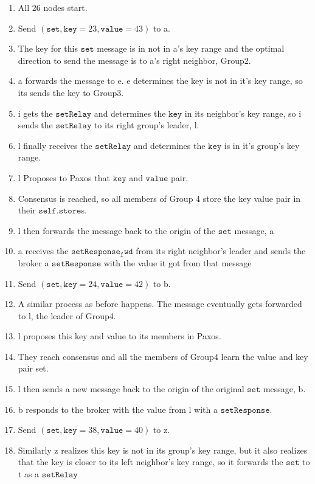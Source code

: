 \documentclass{amsart}
\theoremstyle{definition}
\theoremstyle{remark}
\numberwithin{equation}{section}
\begin{document}
\begin{enumerate}
\item All 26 nodes start.
\item Send $(\mathtt{set}, \mathtt{key}=23, \mathtt{value}=43)$ to a.
\item The key for this $\mathtt{set}$ message is in not in a's key range and the optimal direction to send the message is to a's right neighbor, Group2. 
\item a forwards the message to e. e determines the key is not in it's key range, so its sends the key to Group3.
\item i gets the $\mathtt{setRelay}$ and determines the $\mathtt{key}$ in its neighbor's key range, so i sends the $\mathtt{setRelay}$ to its right group's leader, l.
\item l finally receives the $\mathtt{setRelay}$ and determines the $\mathtt{key}$ is in it's group's key range.
\item l Proposes to Paxos that $\mathtt{key}$ and $\mathtt{value}$ pair.
\item Consensus is reached, so all members of Group 4 store the key value pair in their $\mathtt{self.store}$s.
\item l then forwards the message back to the origin of the $\mathtt{set}$ message, a
\item a receives the $\mathtt{setResponse_fwd}$ from its right neighbor's leader and sends the broker a $\mathtt{setResponse}$ with the value it got from that message
\item Send $(\mathtt{set}, \mathtt{key}=24, \mathtt{value}=42)$ to b.
\item A similar process as before happens. The message eventually gets forwarded to l, the leader of Group4.
\item l proposes this key and value to its members in Paxos. 
\item They reach consensus and all the members of Group4 learn the value and key pair set.
\item l then sends a new message back to the origin of the original $ \mathtt{set}$ message, b.
\item b responds to the broker with the value from l with a $ \mathtt{setResponse}$.
\item Send $(\mathtt{set}, \mathtt{key}=38, \mathtt{value}=40)$ to z.
\item Similarly z realizes this key is not in its group's key range, but it also realizes that the key is closer to  its left neighbor's key range, so it forwards the $\mathtt{set}$ to t as a $\mathtt{setRelay}$

\end{enumerate}
\end{document}
